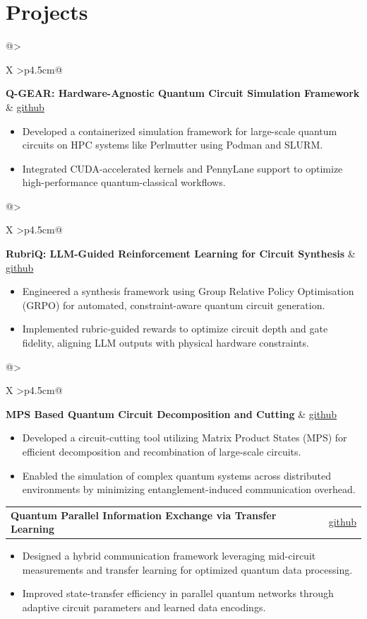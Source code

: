 \documentclass[10pt, letterpaper]{article}
\makeatletter
\newenvironment{highlights}{%
    \begin{itemize}[topsep=0.10cm, parsep=0.10cm, partopsep=0pt, itemsep=0pt,
                    leftmargin=10pt]
}{%
    \end{itemize}%
}
\newcommand{\datedentry}[2]{%
    \begin{tabularx}{\linewidth}{@{}>{\raggedright\arraybackslash}X
                                  >{\raggedleft\arraybackslash}p{4.5cm}@{}}
        #1 & #2
    \end{tabularx}%
}
\makeatother
\begin{document}
\section{Projects}

\datedentry{\textbf{Q-GEAR: Hardware-Agnostic Quantum Circuit Simulation Framework}}{\href{https://github.com/gzquse/qgear}{github}}
\begin{highlights}
\item Developed a containerized simulation framework for large-scale quantum
      circuits on HPC systems like Perlmutter using Podman and SLURM.
\item Integrated CUDA-accelerated kernels and PennyLane support to optimize
      high-performance quantum-classical workflows.
\end{highlights}

\vspace{0.2cm}
\datedentry{\textbf{RubriQ: LLM-Guided Reinforcement Learning for Circuit Synthesis}}{\href{https://github.com/gzquse/llmma2qc}{github}}
\begin{highlights}
\item Engineered a synthesis framework using Group Relative Policy Optimisation
      (GRPO) for automated, constraint-aware quantum circuit generation.
\item Implemented rubric-guided rewards to optimize circuit depth and gate
      fidelity, aligning LLM outputs with physical hardware constraints.
\end{highlights}

\vspace{0.2cm}
\datedentry{\textbf{MPS Based Quantum Circuit Decomposition and Cutting}}{\href{https://github.com/gzquse/ShardQ_v2}{github}}
\begin{highlights}
\item Developed a circuit-cutting tool utilizing Matrix Product States (MPS) for
      efficient decomposition and recombination of large-scale circuits.
\item Enabled the simulation of complex quantum systems across distributed
      environments by minimizing entanglement-induced communication overhead.
\end{highlights}

\vspace{0.2cm}
\datedentry{\textbf{Quantum Parallel Information Exchange via Transfer Learning}}{\href{https://github.com/gzquse/QPIE_datacircuit}{github}}
\begin{highlights}
\item Designed a hybrid communication framework leveraging mid-circuit
      measurements and transfer learning for optimized quantum data processing.
\item Improved state-transfer efficiency in parallel quantum networks through
      adaptive circuit parameters and learned data encodings.
\end{highlights}
\end{document}
